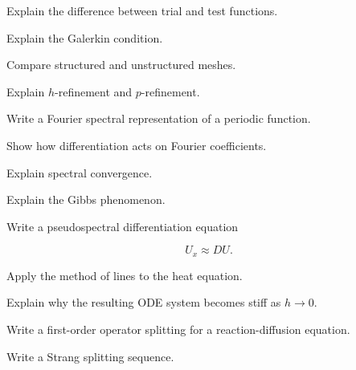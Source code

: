 \begin{exercise}[3]
Explain the difference between trial and test functions.
\end{exercise}

\begin{exercise}[3]
Explain the Galerkin condition.
\end{exercise}

\begin{exercise}[3]
Compare structured and unstructured meshes.
\end{exercise}

\begin{exercise}[3]
Explain \(h\)-refinement and \(p\)-refinement.
\end{exercise}

\begin{exercise}[2]
Write a Fourier spectral representation of a periodic function.
\end{exercise}

\begin{exercise}[3]
Show how differentiation acts on Fourier coefficients.
\end{exercise}

\begin{exercise}[3]
Explain spectral convergence.
\end{exercise}

\begin{exercise}[3]
Explain the Gibbs phenomenon.
\end{exercise}

\begin{exercise}[3]
Write a pseudospectral differentiation equation

\[
U_x\approx DU.
\]
\end{exercise}

\begin{exercise}[2]
Apply the method of lines to the heat equation.
\end{exercise}

\begin{exercise}[3]
Explain why the resulting ODE system becomes stiff as \(h\to0\).
\end{exercise}

\begin{exercise}[3]
Write a first-order operator splitting for a reaction-diffusion equation.
\end{exercise}

\begin{exercise}[3]
Write a Strang splitting sequence.
\end{exercise}

